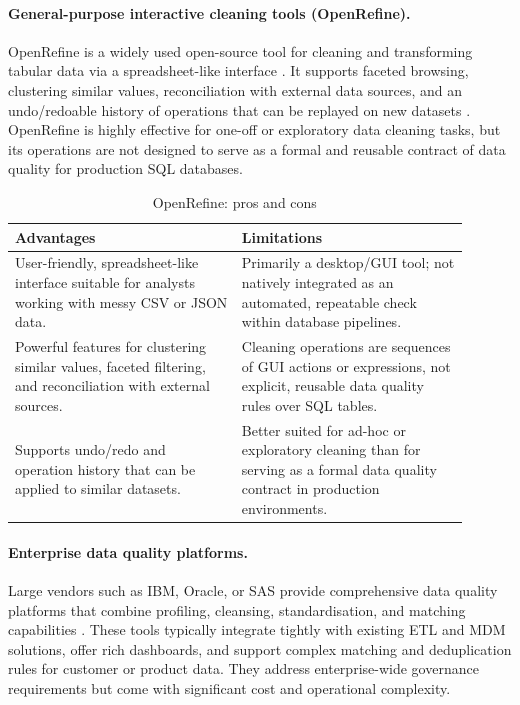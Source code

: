 \paragraph{General-purpose interactive cleaning tools (OpenRefine).}
OpenRefine is a widely used open-source tool for cleaning and transforming tabular data via a spreadsheet-like interface \cite{openrefine-site}. 
It supports faceted browsing, clustering similar values, reconciliation with external data sources, and an undo/redoable history of operations that can be replayed on new datasets \cite{openrefine-site}. 
OpenRefine is highly effective for one-off or exploratory data cleaning tasks, but its operations are not designed to serve as a formal and reusable contract of data quality for production SQL databases. 

\begin{table}[h]
\centering
\caption{OpenRefine: pros and cons}
\begin{tabular}{|p{0.45\linewidth}| p{0.45\linewidth}|}
\hline
\textbf{Advantages} & \textbf{Limitations} \\
\hline
User-friendly, spreadsheet-like interface suitable for analysts working with messy CSV or JSON data. &
Primarily a desktop/GUI tool; not natively integrated as an automated, repeatable check within database pipelines. \\
Powerful features for clustering similar values, faceted filtering, and reconciliation with external sources. &
Cleaning operations are sequences of GUI actions or expressions, not explicit, reusable data quality rules over SQL tables. \\
Supports undo/redo and operation history that can be applied to similar datasets. &
Better suited for ad-hoc or exploratory cleaning than for serving as a formal data quality contract in production environments. \\
\hline
\end{tabular}
\end{table}

\paragraph{Enterprise data quality platforms.}
Large vendors such as IBM, Oracle, or SAS provide comprehensive data quality platforms that combine profiling, cleansing, standardisation, and matching capabilities \cite{rahm2000data}. 
These tools typically integrate tightly with existing ETL and MDM solutions, offer rich dashboards, and support complex matching and deduplication rules for customer or product data. 
They address enterprise-wide governance requirements but come with significant cost and operational complexity.

